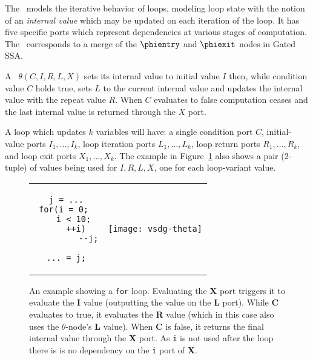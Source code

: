 The \Tn\ models the iterative behavior of loops, modeling loop state with the notion of an \emph{internal value} which may be updated on each iteration of the loop. 
It has five specific ports which represent dependencies at various stages of computation. 
The \Tn\ corresponds to a merge of the $\phientry$ and $\phiexit$ nodes in Gated SSA.
%

A \Tn\ $\theta(C,I,R,L,X)$ sets its internal value to initial value $I$ then, while condition value $C$ holds true, sets $L$ to the current internal value and updates the internal value with the repeat value $R$. 
When $C$ evaluates to false computation ceases and the last internal value is returned through the $X$ port.

%
A loop which updates $k$ variables will have: 
a single condition port $C$, initial-value ports $I_1,\ldots,I_k$, loop iteration ports $L_1,\ldots,L_k$, loop return ports $R_1,\ldots,R_k$, and loop exit ports $X_1,\ldots,X_k$. 
The example in Figure~\ref{fig:thetatuple} also shows a pair (2-tuple) of values being used for $I,R,L,X$, one for each loop-variant value.


\begin{figure}[!ht]
\centering
\begin{tabular}{cc} \cline{1-1}
\begin{minipage}[c][\height][t]{0.9in}
\begin{verbatim}
j = ...
for(i = 0; 
    i < 10; 
    ++i)
         --j;
	
... = j;
\end{verbatim}
\end{minipage}
&
\begin{minipage}[c][\height][b]{3.0in}
\texttt{[image: vsdg-theta]}
\end{minipage} \\ \cline{1-1}
\end{tabular}

\caption{An example showing a \texttt{for} loop. 
  Evaluating the \textbf{X} port triggers it to evaluate the \textbf{I} value (outputting the value on the \textbf{L} port). 
  While \textbf{C} evaluates to true, it evaluates the \textbf{R} value (which in this case also uses the $\theta$-node's \textbf{L} value). 
  When \textbf{C} is false, it returns the final internal value through the \textbf{X} port. 
  As \texttt{i} is not used after the loop there is is no dependency on the \texttt{i} port of \textbf{X}.}
\label{fig:thetatuple}
\end{figure}

